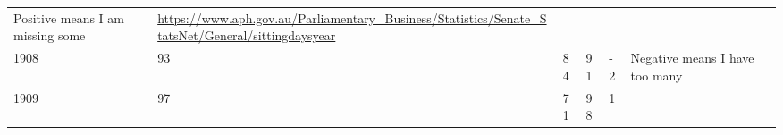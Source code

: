 \documentclass[12pt,]{article}
\theoremstyle{definition}
\theoremstyle{definition}
\theoremstyle{definition}
\theoremstyle{remark}
\begin{document}
\begin{longtable}[]{@{}lllllll@{}}
\begin{minipage}[t]{0.11\columnwidth}
Positive means I am missing some\strut
\end{minipage} & \begin{minipage}[t]{0.31\columnwidth}\raggedright\strut
\url{https://www.aph.gov.au/Parliamentary_Business/Statistics/Senate_StatsNet/General/sittingdaysyear}\strut
\end{minipage}\tabularnewline
\begin{minipage}[t]{0.02\columnwidth}\raggedright\strut
1908\strut
\end{minipage} & \begin{minipage}[t]{0.09\columnwidth}\raggedright\strut
93\strut
\end{minipage} & \begin{minipage}[t]{0.10\columnwidth}\raggedright\strut
84\strut
\end{minipage} & \begin{minipage}[t]{0.10\columnwidth}\raggedright\strut
91\strut
\end{minipage} & \begin{minipage}[t]{0.07\columnwidth}\raggedright\strut
-2\strut
\end{minipage} & \begin{minipage}[t]{0.11\columnwidth}\raggedright\strut
Negative means I have too many\strut
\end{minipage} & \begin{minipage}[t]{0.31\columnwidth}\raggedright\strut
\strut
\end{minipage}\tabularnewline
\begin{minipage}[t]{0.02\columnwidth}\raggedright\strut
1909\strut
\end{minipage} & \begin{minipage}[t]{0.09\columnwidth}\raggedright\strut
97\strut
\end{minipage} & \begin{minipage}[t]{0.10\columnwidth}\raggedright\strut
71\strut
\end{minipage} & \begin{minipage}[t]{0.10\columnwidth}\raggedright\strut
98\strut
\end{minipage} & \begin{minipage}[t]{0.07\columnwidth}\raggedright\strut
1\strut
\end{minipage} & \begin{minipage}[t]{0.11\columnwidth}\raggedright\strut
\strut
\end{minipage} & \begin{minipage}[t]{0.31\columnwidth}\raggedright\strut

\end{minipage}
\end{longtable}
\end{document}
